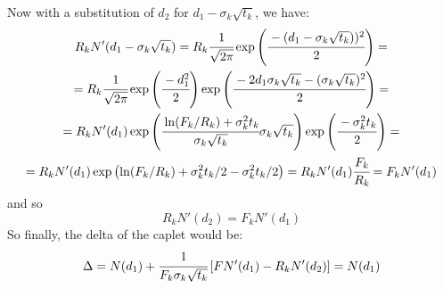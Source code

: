 \documentclass[12pt,a4paper]{exam}
\begin{document}
\begin{questions}
\begin{solution}
Now with a substitution of $d_2$ for $d_1-\sigma_k\sqrt{t_k}$, we have:
\begin{equation*}
\begin{gathered}
R_kN'(d_1 - \sigma_k\sqrt{t_k}) = R_k\cfrac{1}{\sqrt{2\pi}}\exp\left(\cfrac{-(d_1-\sigma_k\sqrt{t_k}))^2}{2}\right) = \\
= R_k\cfrac{1}{\sqrt{2\pi}}\exp\left(\cfrac{-d_1^2}{2}\right)\exp\left(\cfrac{-2d_1\sigma_k\sqrt{t_k}-(\sigma_k\sqrt{t_k})^2}{2}\right) = \\  = R_kN'(d_1)\exp\left(\cfrac{\ln(F_k/R_k)+\sigma_k^2t_k}{\sigma_k\sqrt{t_k}}\sigma_k\sqrt{t_k}\right)\exp\left(\cfrac{-\sigma_k^2t_k}{2}\right) = \\
=R_kN'(d_1)\exp\left(\ln(F_k/R_k)+\sigma^2_kt_k/2-\sigma^2_kt_k/2\right) = R_kN'(d_1)\cfrac{F_k}{R_k} = F_kN'(d_1)
\end{gathered}
\end{equation*}
and so
\begin{equation*}
	R_kN'(d_2)=F_kN'(d_1)
\end{equation*}
So finally, the delta of the caplet would be:
\begin{equation*}
\Delta = N(d_1) + \cfrac{1}{F_k\sigma_k\sqrt{t_k}}\left[FN'(d_1)-R_kN'(d_2)\right] =
N(d_1)
\end{equation*}
\end{solution}


\end{questions}
\end{document}
